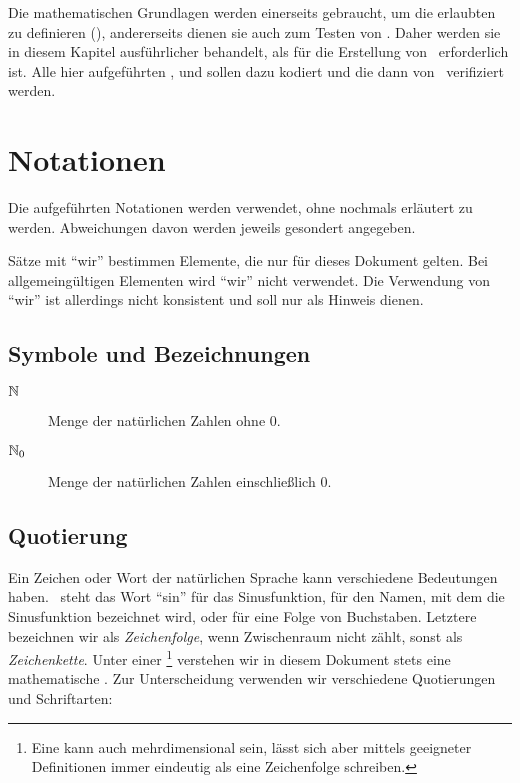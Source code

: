 Die mathematischen Grundlagen werden einerseits gebraucht, um die erlaubten  zu definieren (), andererseits dienen sie auch zum Testen von \ASBA.
Daher werden sie in diesem Kapitel ausführlicher behandelt, als für die Erstellung von \ASBA\ erforderlich ist.
Alle hier aufgeführten ,  und  sollen dazu kodiert und die  dann von \ASBA\ verifiziert werden.

\section{Notationen}%
\label{sec:Notationen}

Die  aufgeführten Notationen werden  verwendet, ohne nochmals erläutert zu werden. Abweichungen davon werden jeweils gesondert angegeben.

Sätze mit \enquote{wir} bestimmen Elemente, die nur für dieses Dokument gelten.
Bei allgemeingültigen Elementen wird \enquote{wir} nicht verwendet.
Die Verwendung von \enquote{wir} ist allerdings nicht konsistent und soll nur als Hinweis dienen.

\subsection{Symbole und Bezeichnungen}%
\label{sub:Bezeichnungen}

\begin{description}
	\item[$\mathbb{N}$]   Menge der natürlichen Zahlen ohne           0.
	\item[$\mathbb{N}_0$]  Menge der natürlichen Zahlen einschließlich 0.
\end{description}

\subsection{Quotierung}%
\label{sub:Quotierung}

Ein Zeichen oder Wort der natürlichen Sprache kann verschiedene Bedeutungen haben.
\textZB\ steht das Wort \enquote{sin} für das  Sinusfunktion, für den Namen, mit dem die Sinusfunktion bezeichnet wird, oder für eine Folge von Buchstaben.
Letztere bezeichnen wir als \emph{Zeichenfolge}, wenn Zwischenraum nicht zählt, sonst als \emph{Zeichenkette}.
Unter einer \emph{}\footnote{%
	Eine  kann auch mehrdimensional sein, lässt sich aber mittels geeigneter Definitionen immer eindeutig als eine Zeichenfolge schreiben.
} verstehen wir in diesem Dokument stets eine mathematische .
Zur Unterscheidung verwenden wir verschiedene Quotierungen und Schriftarten:

